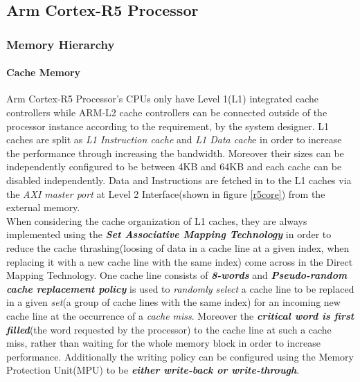 \documentclass[a4paper,11pt]{article}
\begin{document}

\subsection{Arm Cortex-R5 Processor}

\subsubsection{Memory Hierarchy}

\paragraph{Cache Memory} Arm Cortex-R5 Processor's CPUs only have Level 1(L1) integrated cache controllers while ARM-L2 cache controllers can be connected outside of the processor instance according to the requirement, by the system designer. L1 caches are split as \textit{L1 Instruction cache} and \textit{L1 Data cach}e in order to increase the performance through increasing the bandwidth. Moreover their sizes can be independently configured to be between 4KB and 64KB and each cache can be disabled independently. Data and Instructions are fetched in to the L1 caches via the \textit{AXI master port} at Level 2 Interface(shown in figure \ref{r5core}) from the external memory.\\

 When considering the cache organization of L1 caches, they are always implemented using the \textit{\textbf{Set Associative Mapping Technology}} in order to reduce the cache thrashing(loosing of data in a cache line at a given index, when replacing it with a new cache line with the same index) come across in the Direct Mapping Technology. One cache line consists of \textit{\textbf{8-words}} and \textit{\textbf{Pseudo-random cache replacement policy}}  is used to \textit{randomly select} a cache line to be replaced in a given \textit{set}(a group of cache lines with the same index) for an incoming new cache line at the occurrence of a \textit{cache miss}. Moreover the \textbf{\textit{critical word is first filled}}(the word requested by the processor) to the cache line at such a cache miss, rather than waiting for the whole memory block in order to increase performance. Additionally the writing policy can be configured using the Memory Protection Unit(MPU) to be \textbf{\textit{either write-back or write-through}}.


\end{document}
